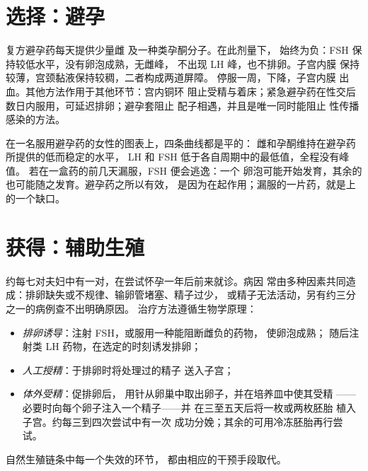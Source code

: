 \section{选择：避孕}

\begin{proposition}[激素避孕]\label{prop:g11:hormones-and-reproduction:contraception}
复方避孕药每天提供少量雌
及一种类孕酮分子。在此剂量下，
始终为负：FSH 保持较低水平，没有卵泡成熟，无雌峰，
不出现 LH 峰，也不排卵。子宫内膜
保持较薄，宫颈黏液保持较稠，二者构成两道屏障。
停服一周，下降，子宫内膜
出血。其他方法作用于其他环节：宫内铜环
阻止受精与着床；紧急避孕药在性交后
数日内服用，可延迟排卵；避孕套阻止
配子相遇，并且是唯一同时能阻止
性传播感染的方法。
\end{proposition}
\admitted

\begin{example}[读懂避孕药的效果]\label{ex:g11:hormones-and-reproduction:pill}
在一名服用避孕药的女性的图表上，四条曲线都是平的：
雌和孕酮维持在避孕药所提供的低而稳定的水平，
LH 和 FSH 低于各自周期中的最低值，全程没有峰值。
若在一盒药的前几天漏服，FSH 便会逃逸：一个
卵泡可能开始发育，其余的也可能随之发育。避孕药之所以有效，
是因为在起作用；漏服的一片药，就是上的一个缺口。
\end{example}

\section{获得：辅助生殖}

\begin{proposition}[未能怀孕时]\label{prop:g11:hormones-and-reproduction:art}
约每七对夫妇中有一对，在尝试怀孕一年后前来就诊。病因
常由多种因素共同造成：排卵缺失或不规律、输卵管堵塞、精子过少，
或精子无法活动，另有约三分之一的病例查不出明确原因。
治疗方法遵循生物学原理：
\begin{itemize}
  \item \emph{排卵诱导}：注射 FSH，或服用一种能阻断雌负的药物，
        使卵泡成熟；
        随后注射类 LH 药物，在选定的时刻诱发排卵；
  \item \emph{人工授精}：于排卵时将处理过的精子
        送入子宫；
  \item \emph{体外受精}：促排卵后，
        用针从卵巢中取出卵子，并在培养皿中使其受精
——必要时向每个卵子注入一个精子——并
        在三至五天后将一枚或两枚胚胎
        植入子宫。约每三到四次尝试中有一次
        成功分娩；其余的可用冷冻胚胎再行尝试。
\end{itemize}
自然生殖链条中每一个失效的环节，
都由相应的干预手段取代。
\end{proposition}
\admitted


